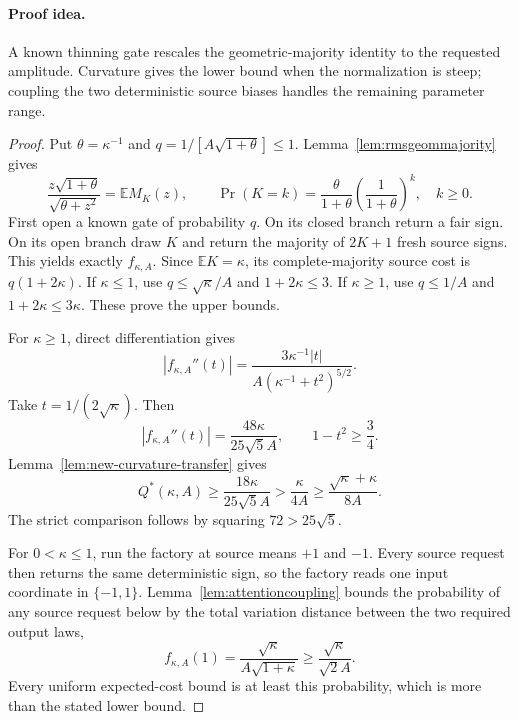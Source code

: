 \paragraph{Proof idea.}
A known thinning gate rescales the geometric-majority identity
to the requested amplitude. Curvature gives the lower bound when the
normalization is steep; coupling the two deterministic source biases
handles the remaining parameter range.

\begin{proof}
Put $\theta=\kappa^{-1}$ and
$q=1/[A\sqrt{1+\theta}]\le1$. Lemma~\ref{lem:rmsgeommajority} gives
\[
 \frac{z\sqrt{1+\theta}}{\sqrt{\theta+z^2}}
 =\mathbb E M_K(z),\qquad
 \Pr(K=k)=\frac\theta{1+\theta}
               \left(\frac1{1+\theta}\right)^k,
 \quad k\ge0.
\]
First open a known gate of probability $q$.  On its closed branch
return a fair sign.  On its open branch draw $K$ and return the
majority of $2K+1$ fresh source signs.  This yields exactly
$f_{\kappa,A}$.  Since $\mathbb EK=\kappa$, its complete-majority
source cost is $q(1+2\kappa)$.  If $\kappa\le1$, use
$q\le\sqrt\kappa/A$ and $1+2\kappa\le3$.  If $\kappa\ge1$, use
$q\le1/A$ and $1+2\kappa\le3\kappa$.  These prove the upper bounds.

For $\kappa\ge1$, direct differentiation gives
\[
 |f_{\kappa,A}''(t)|
 =\frac{3\kappa^{-1}|t|}
        {A(\kappa^{-1}+t^2)^{5/2}}.
\]
Take $t=1/(2\sqrt\kappa)$.  Then
\[
 |f_{\kappa,A}''(t)|=\frac{48\kappa}{25\sqrt5 A},\qquad
 1-t^2\ge\frac34.
\]
Lemma~\ref{lem:new-curvature-transfer} gives
\[
 Q^*(\kappa,A)\ge\frac{18\kappa}{25\sqrt5 A}
                 >\frac\kappa{4A}
                 \ge\frac{\sqrt\kappa+\kappa}{8A}.
\]
The strict comparison follows by squaring $72>25\sqrt5$.

For $0<\kappa\le1$, run the factory at source means $+1$ and $-1$.
Every source request then returns the same deterministic sign, so the
factory reads one input coordinate in $\{-1,1\}$.
Lemma~\ref{lem:attentioncoupling} bounds the probability of any
source request below by the total variation distance between the
two required output laws,
\[
 f_{\kappa,A}(1)=\frac{\sqrt\kappa}{A\sqrt{1+\kappa}}
                \ge\frac{\sqrt\kappa}{\sqrt2 A}.
\]
Every uniform expected-cost bound is at least this probability,
which is more than the stated lower bound.


\end{proof}
